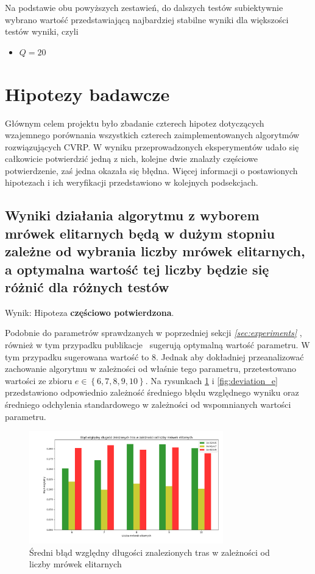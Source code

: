 \documentclass[10pt]{article}
\begin{document}
Na podstawie obu powyższych zestawień, do dalszych testów subiektywnie wybrano wartość przedstawiającą najbardziej stabilne wyniki dla większości testów wyniki, czyli
\begin{itemize}
    \item $Q = 20$
\end{itemize}

\section{Hipotezy badawcze}
Głównym celem projektu było zbadanie czterech hipotez dotyczących wzajemnego porównania wszystkich czterech zaimplementowanych algorytmów rozwiązujących CVRP. W wyniku przeprowadzonych eksperymentów udało się całkowicie potwierdzić jedną z nich, kolejne dwie znalazły częściowe potwierdzenie, zaś jedna okazała się błędna. Więcej informacji o postawionych hipotezach i ich weryfikacji przedstawiono w kolejnych podsekcjach.

\subsection{Wyniki działania algorytmu z wyborem mrówek elitarnych będą w dużym stopniu zależne od wybrania liczby mrówek elitarnych, a optymalna wartość tej liczby będzie się różnić dla różnych testów}
Wynik: Hipoteza \textbf{częściowo potwierdzona}.

Podobnie do parametrów sprawdzanych w poprzedniej sekcji \textit{\ref{sec:experiments} }, również w tym przypadku publikacje~\cite{Dorigo1996} \cite{Dorigo1999} sugerują optymalną wartość parametru. W tym przypadku sugerowana wartość to $8$. Jednak aby dokładniej przeanalizować zachowanie algorytmu w zależności od właśnie tego parametru, przetestowano wartości ze zbioru $e \in \left\{ 6, 7, 8, 9, 10 \right\}$. Na rysunkach \ref{fig:errors_e} i \ref{fig:deviation_e} przedstawiono odpowiednio zależność średniego błędu względnego wyniku oraz średniego odchylenia standardowego w zależności od wspomnianych wartości parametru. 

\begin{figure}[H]
    \centering
    \includegraphics[width=0.75\textwidth]{errors_e.png}
    \caption{Średni błąd względny długości znalezionych tras w zależności od liczby mrówek elitarnych}
    \label{fig:errors_e}
\end{figure}
\end{document}
